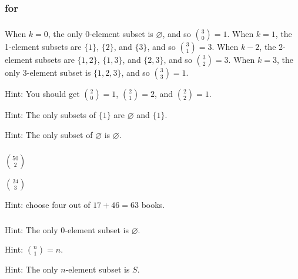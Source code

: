 \subsection{\answers}

\subsubsection{\answers for  \subsubsetschoose}

\subsubsection*{ \answers}
    \begin{apart}
        \item When $k=0$, the only 0-element subset is $\varnothing$, and so $\binom{3}{0}=1$.  When $k=1$, the 1-element subsets are $\{1\}$, $\{2\}$, and $\{3\}$, and so $\binom{3}{1}=3$.  When $k-2$, the 2-element subsets are $\{1,2\}$, $\{1,3\}$, and $\{2,3\}$, and so $\binom{3}{2}=3$. When $k=3$, the only 3-element subset is $\{1,2,3\}$, and so $\binom{3}{3}=1$.
        \item Hint: You should get $\binom{2}{0}=1$, $\binom{2}{1}=2$, and $\binom{2}{2}=1$.
        \item Hint: The only subsets of $\{1\}$ are $\varnothing$ and $\{1\}$.
        \item Hint: The only subset of $\varnothing$ is $\varnothing$.
    \end{apart}

\subsubsection*{ \answers}
    \begin{apart}
        \item $\binom{50}{2}$
        \item $\binom{24}{3}$
        \item Hint: choose four out of $17 + 46 = 63$ books.
    \end{apart}
    
\subsubsection*{ \answers}
    \begin{apart}
        \item Hint: The only 0-element subset is $\varnothing$.
        \item Hint: $\binom{n}{1}=n$.
        \item Hint: The only $n$-element subset is $S$.
    \end{apart}

